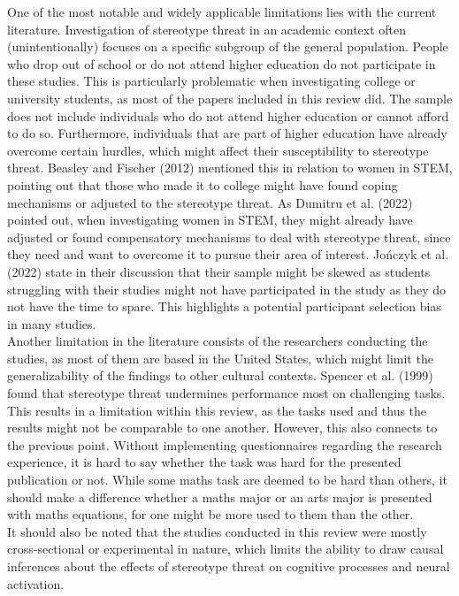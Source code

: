 \documentclass[
  stu, a4paper,floatsintext]{apa7}
\begin{document}
One of the most notable and widely applicable limitations lies with the current literature.
Investigation of stereotype threat in an academic context often (unintentionally) focuses on a specific subgroup of the general population.
People who drop out of school or do not attend higher education do not participate in these studies.
This is particularly problematic when investigating college or university students, as most of the papers included in this review did.
The sample does not include individuals who do not attend higher education or cannot afford to do so.
Furthermore, individuals that are part of higher education have already overcome certain hurdles, which might affect their susceptibility to stereotype threat.
Beasley and Fischer (2012) mentioned this in relation to women in STEM, pointing out that those who made it to college might have found coping mechanisms or adjusted to the stereotype threat. As Dumitru et al. (2022) pointed out, when investigating women in STEM, they might already have adjusted or found compensatory mechanisms to deal with stereotype threat, since they need and want to overcome it to pursue their area of interest.
Jończyk et al. (2022) state in their discussion that their sample might be skewed as students struggling with their studies might not have participated in the study as they do not have the time to spare.
This highlights a potential participant selection bias in many studies.\\
Another limitation in the literature consists of the researchers conducting the studies, as most of them are based in the United States, which might limit the generalizability of the findings to other cultural contexts.
Spencer et al. (1999) found that stereotype threat undermines performance most on challenging tasks.
This results in a limitation within this review, as the tasks used and thus the results might not be comparable to one another.
However, this also connects to the previous point.
Without implementing questionnaires regarding the research experience, it is hard to say whether the task was hard for the presented publication or not.
While some maths task are deemed to be hard than others, it should make a difference whether a maths major or an arts major is presented with maths equations, for one might be more used to them than the other.\\
It should also be noted that the studies conducted in this review were mostly cross-sectional or experimental in nature, which limits the ability to draw causal inferences about the effects of stereotype threat on cognitive processes and neural activation.
\end{document}
